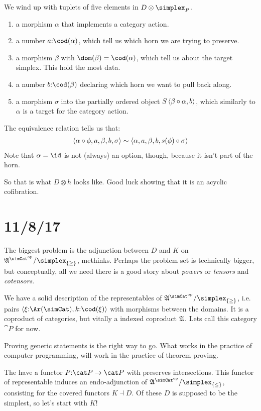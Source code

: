 \documentclass[csh.tex]{subfiles}
\begin{document}
We wind up with tuplets of five elements in $D\otimes \simplex_P$.
\begin{enumerate}
\item a morphism $\alpha$ that implements a category action.
\item a number $a\of\cod(\alpha)$, which tell us which horn we are trying to preserve.
\item a morphism $\beta$ with $\dom(\beta) = \cod(\alpha)$, which tell us about the target simplex. This hold the most data.
\item a number $b\of \cod(\beta)$ declaring which horn we want to pull back along.
\item a morphism $\sigma$ into the partially ordered object $S\left\langle \beta\circ \alpha,b \right\rangle$, which similarly to $\alpha$ is a target for the category action.
\end{enumerate}
The equivalence relation tells us that:
\begin{align*}
\left\langle \alpha\circ\phi,a,\beta,b,\sigma \right\rangle&\sim
\left\langle \alpha,a,\beta,b,s(\phi)\circ\sigma \right\rangle\\
\end{align*}
Note that $\alpha=\id$ is not (always) an option, though, because it isn't part of the horn.

So that is what $D\otimes h$ looks like. Good luck showing that it is an acyclic cofibration.

\section{11/8/17}
The biggest problem is the adjunction between $D$ and $K$ on $\ambient\s/\simplex_{\set\geq}$, methinks.
Perhaps the problem set is technically bigger, but conceptually, all we need there is a good story about \emph{powers} or \emph{tensors} and \emph{cotensors}.

We have a solid description of the representables of $\ambient\s/\simplex_{\set\geq}$, i.e. pairs $\tuplet{\xi\of\Ar(\simCat),k\of \cod(\xi)}$ with morphisms between the domains. It is a coproduct of categories, but vitally a indexed coproduct $\mathfrak A$. Lets call this category $\cat P$ for now.

Proving generic statements is the right way to go. What works in the practice of computer programming, will work in the practice of theorem proving.

The have a functor $P\of \cat P\to\cat P$ with preserves intersections. This functor of representable induces an endo-adjunction of $\ambient\s/\simplex_{\set\leq}$, consisting for the covered functors $K\dashv D$. Of these $D$ is supposed to be the simplest, so let's start with $K$!
\end{document}
